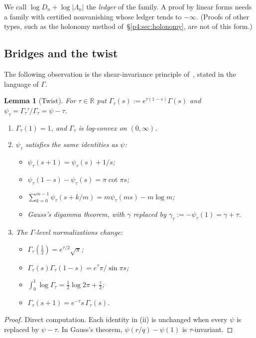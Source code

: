 \documentclass[11pt,a4paper]{article}
\newtheorem{lemma}[theorem]{Lemma}
\theoremstyle{definition}
\theoremstyle{remark}
\newcommand{\R}{\mathbb R}
\numberwithin{equation}{section}
\begin{document}
We call $\log D_n+\log|\Lambda_n|$ the \emph{ledger} of the family. A proof by linear forms needs a family with certified nonvanishing whose ledger tends to $-\infty$. (Proofs of other types, such as the holonomy method of~\S\ref{p4:sec:holonomy}, are not of this form.)

\subsection{Bridges and the twist}

The following observation is the shear-invariance principle of~\cite{p4:K1}, stated in the language of $\Gamma$.

\begin{lemma}[Twist]\label{p4:lem:twist}
For $\tau\in\R$ put $\Gamma_\tau(s):=e^{\tau(1-s)}\Gamma(s)$ and $\psi_\tau=\Gamma_\tau'/\Gamma_\tau=\psi-\tau$.
\begin{enumerate}[label=(\roman*),leftmargin=2em]
\item $\Gamma_\tau(1)=1$, and $\Gamma_\tau$ is log-convex on $(0,\infty)$.
\item $\psi_\tau$ satisfies the same identities as $\psi$:
\begin{itemize}[leftmargin=1.5em]
\item $\psi_\tau(s+1)=\psi_\tau(s)+1/s$;
\item $\psi_\tau(1-s)-\psi_\tau(s)=\pi\cot\pi s$;
\item $\sum_{k=0}^{m-1}\psi_\tau(s+k/m)=m\psi_\tau(ms)-m\log m$;
\item Gauss's digamma theorem, with $\gamma$ replaced by $\gamma_\tau:=-\psi_\tau(1)=\gamma+\tau$.
\end{itemize}
\item The $\Gamma$-level normalizations change:
\begin{itemize}[leftmargin=1.5em]
\item $\Gamma_\tau(\tfrac12)=e^{\tau/2}\sqrt\pi$;
\item $\Gamma_\tau(s)\Gamma_\tau(1-s)=e^{\tau}\pi/\sin\pi s$;
\item $\int_0^1\log\Gamma_\tau=\tfrac12\log2\pi+\tfrac\tau2$;
\item $\Gamma_\tau(s+1)=e^{-\tau}s\,\Gamma_\tau(s)$.
\end{itemize}
\end{enumerate}
\end{lemma}

\begin{proof}
Direct computation. Each identity in (ii) is unchanged when every $\psi$ is replaced by $\psi-\tau$. In Gauss's theorem, $\psi(r/q)-\psi(1)$ is $\tau$-invariant.
\end{proof}
\end{document}
